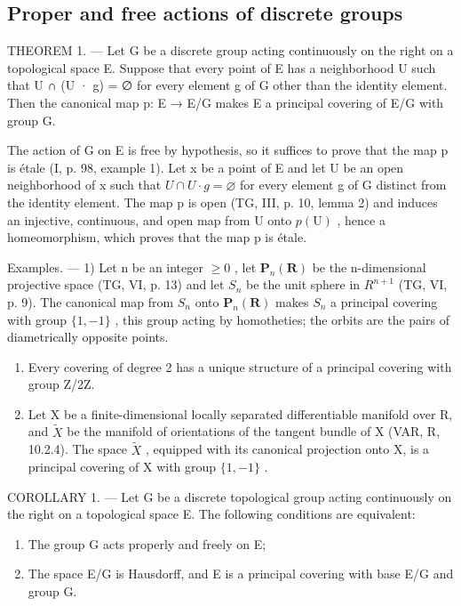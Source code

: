 \subsection{Proper and free actions of discrete groups}

THEOREM 1. --- Let G be a discrete group acting continuously on the right on a topological space E. Suppose that every point of E has a neighborhood U such that U ∩ (U · g) = ∅ for every element g of G other than the identity element. Then the canonical map p: E → E/G makes E a principal covering of E/G with group G.

The action of G on E is free by hypothesis, so it suffices to prove that the map p is étale (I, p. 98, example 1). Let x be a point of E and let U be an open neighborhood of x such that \(U \cap U \cdot g = \varnothing\) for every element g of G distinct from the identity element. The map p is open (TG, III, p. 10, lemma 2) and induces an injective, continuous, and open map from U onto \(p(\mathrm{U})\) , hence a homeomorphism, which proves that the map p is étale.

Examples. --- 1) Let n be an integer \(\geqslant 0\) , let \(\mathbf{P}_{n}(\mathbf{R})\) be the n-dimensional projective space (TG, VI, p. 13) and let \(S_{n}\) be the unit sphere in \(R^{n+1}\) (TG, VI, p. 9). The canonical map from \(S_{n}\) onto \(\mathbf{P}_{n}(\mathbf{R})\) makes \(S_{n}\) a principal covering with group \(\{1,-1\}\) , this group acting by homotheties; the orbits are the pairs of diametrically opposite points.

\begin{enumerate}
\def\labelenumi{\arabic{enumi})}
\setcounter{enumi}{1}
\item
  Every covering of degree 2 has a unique structure of a principal covering with group Z/2Z.
\item
  Let X be a finite-dimensional locally separated differentiable manifold over R, and \(\widetilde{X}\) be the manifold of orientations of the tangent bundle of X (VAR, R, 10.2.4). The space \(\widetilde{X}\) , equipped with its canonical projection onto X, is a principal covering of X with group \(\{1,-1\}\) .
\end{enumerate}

COROLLARY 1. --- Let G be a discrete topological group acting continuously on the right on a topological space E. The following conditions are equivalent:

\begin{enumerate}
\def\labelenumi{(\roman{enumi})}
\item
  The group G acts properly and freely on E;
\item
  The space E/G is Hausdorff, and E is a principal covering with base E/G and group G.
\end{enumerate}

